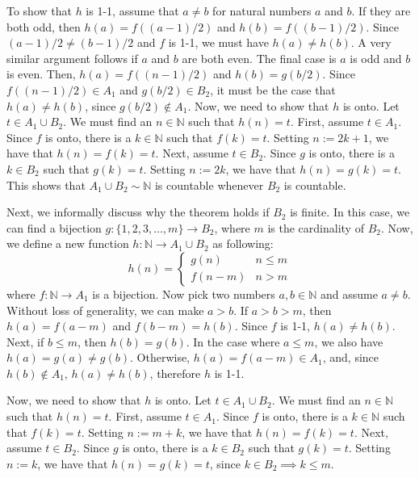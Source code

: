\documentclass{article}
\newcommand{\N}{\mathbb{N}}
\begin{document}
\begin{enumerate}
\begin{enumerate}
		      To show that $h$ is 1-1, assume that $a \neq b$ for natural numbers $a$ and $b$. If they are both odd, then $h(a) = f((a-1)/2)$ and $h(b) = f((b-1)/2)$. Since $(a-1)/2 \neq (b-1)/2$ and $f$ is 1-1, we must have $h(a) \neq h(b)$.
		      A very similar argument follows if $a$ and $b$ are both even. The final case is $a$ is odd and $b$ is even. Then, $h(a) = f((n-1)/2)$ and $h(b) = g(b/2)$. Since $f((n-1)/2) \in A_1$ and $g(b/2) \in B_2$, it must be the case that $h(a) \neq h(b)$, since $g(b/2) \notin A_1$. Now, we need to show that $h$ is onto. Let $t \in A_1 \cup B_2$. We must find an $n \in \N$ such that $h(n) = t$. First, assume $t \in A_1$. Since $f$ is onto, there is a $k \in \N$ such that $f(k) = t$. Setting $n := 2k + 1$, we have that $h(n)=f(k)=t$. Next, assume $t \in B_2$. Since $g$ is onto, there is a $k \in B_2$ such that $g(k) = t$. Setting $n := 2k$, we have that $h(n)=g(k)=t$.
		      This shows that $A_1 \cup B_2 \sim \N$ is countable whenever $B_2$ is countable.
		      		      		      	      	      	      	        
		      Next, we informally discuss why the theorem holds if $B_2$ is finite. In this case, we can find a bijection $g: \{1, 2, 3, \dots, m\} \rightarrow B_2$, where $m$ is the cardinality of $B_2$. Now, we define a new function $h: \N \rightarrow A_1 \cup B_2$ as following: 
		      \begin{equation*}
		      	h(n) = \begin{cases}
		      	g(n) & n \leq m \\
		      	f(n-m) & n > m
		      	\end{cases}
		      \end{equation*}
		      where $f : \N \rightarrow A_1$ is a bijection. Now pick two numbers $a, b \in \N$ and assume $a \neq b$. Without loss of generality, we can make $a > b$. If $a > b > m$, then $h(a) = f(a-m)$ and $f(b-m) = h(b)$. Since $f$ is 1-1, $h(a) \neq h(b)$. Next, if $b \leq m$,  then $h(b) = g(b)$. In the case where $a \leq m$, we also have $h(a) = g(a) \neq g(b)$. Otherwise, $h(a) = f(a-m) \in A_1$, and, since $h(b) \notin A_1$, $h(a) \neq h(b)$, therefore $h$ is 1-1.
		      		      		      	      	      	      	        
		      Now, we need to show that $h$ is onto. Let $t \in A_1 \cup B_2$. We must find an $n \in \N$ such that $h(n) = t$. First, assume $t \in A_1$. Since $f$ is onto, there is a $k \in \N$ such that $f(k) = t$. Setting $n := m + k$, we have that $h(n) = f(k) = t$. Next, assume $t \in B_2$. Since $g$ is onto, there is a $k \in B_2$ such that $g(k) = t$. Setting $n := k$, we have that $h(n)=g(k)=t$, since $k \in B_2 \implies k \leq m$.
		      		      		      	      	      	      	        

\end{enumerate}
\end{enumerate}
\end{document}
